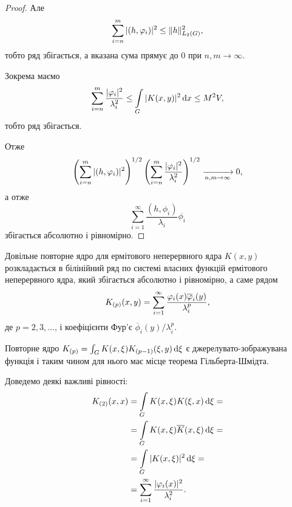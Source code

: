 \begin{proof}
	Але
	\begin{equation}
		\displaystyle\sum\limits_{i=n}^m |(h, \varphi_i)|^2 \le \|h\|_{L_2(G)}^2,
	\end{equation}
	тобто ряд збігається, а вказана сума прямує до 0 при $n, m \to \infty$.

	Зокрема маємо
	\begin{equation}
		\displaystyle\sum\limits_{i=n}^m \dfrac{|\varphi_i|^2}{\lambda_i^2} \le \displaystyle\int\limits_G |K(x, y)|^2 \mathop{}\!\mathrm{d} x \le M^2 V, 
	\end{equation}
	тобто ряд збігається. \medskip

	Отже
	\begin{equation}
		\left(\displaystyle\sum\limits_{i=n}^m |(h, \varphi_i)|^2\right)^{1/2} \left(\displaystyle\sum\limits_{i=n}^m \dfrac{|\varphi_i|^2}{\lambda_i^2}\right)^{1/2} \xrightarrow[n, m \to \infty]{} 0,
	\end{equation}
	а отже
	\begin{equation}
		\sum_{i=1}^\infty \frac{(h, \phi_i)}{\lambda_i} \phi_i
	\end{equation}
	збігається абсолютно і рівномірно.
\end{proof}

\begin{corollary}
	\label{corollary:2.4.10}
	Довільне повторне ядро для ермітового неперервного ядра $K(x ,y)$ розкладається в білінійний ряд по системі власних функцій ермітового неперервного ядра, який збігається абсолютно і рівномірно, а саме рядом
	\begin{equation}
		K_{(p)}(x, y) = \displaystyle\sum\limits_{i = 1}^\infty \dfrac{\varphi_i(x) \overline {\varphi}_i(y)}{\lambda_i^p},
	\end{equation}
	де $p = 2, 3, \ldots$, і коефіцієнти Фур'є  $\overline \phi_i(y) / \lambda_i^p$.
\end{corollary}

Повторне ядро $K_{(p)} = \int_G K(x, \xi) K_{(p - 1)} (\xi, y) \mathop{}\!\mathrm{d} \xi$ є джерелувато-зображувана функція і таким чином для нього має місце теорема Гільберта-Шмідта. \medskip

Доведемо деякі важливі рівності:
\begin{equation}
	\begin{aligned}
	K_{(2)} (x, x) &= \displaystyle\int\limits_G K(x, \xi) K(\xi, x) \mathop{}\!\mathrm{d} \xi = \\
	&= \displaystyle\int\limits_G K(x, \xi) \overline K(x, \xi) \mathop{}\!\mathrm{d} \xi = \\
	&= \displaystyle\int\limits_G |K(x, \xi)|^2 \mathop{}\!\mathrm{d} \xi = \\
	&= \displaystyle\sum\limits_{i = 1}^\infty \dfrac{|\varphi_i(x)|^2}{\lambda_i^2}.
	\end{aligned}
\end{equation}

